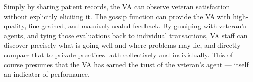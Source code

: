 %
%
%

Simply by sharing patient records, the VA can observe veteran satisfaction without explicitly eliciting it.
The gossip function can provide the VA with high-quality, fine-grained, and massively-scaled feedback.
By gossiping with veteran's agents, and tying those evaluations back to individual transactions, VA staff can discover precisely what is going well and where problems may lie, and directly compare that to private practices both collectively and individually.
This of course presumes that the VA has earned the trust of the veteran's agent --- itself an indicator of performance.
